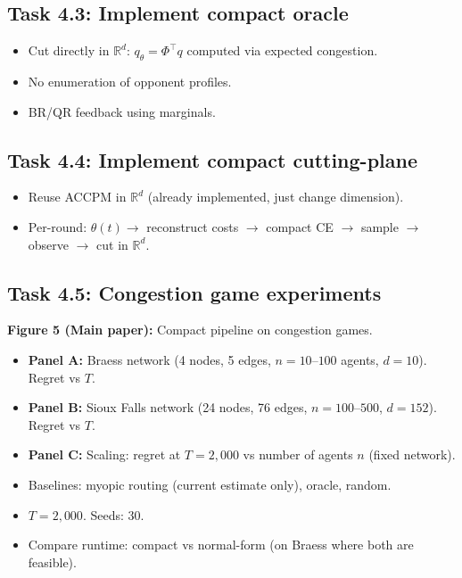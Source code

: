 \documentclass[11pt]{article}
\newcommand{\R}{\mathbb{R}}
\begin{document}
\subsection{Task 4.3: Implement compact oracle}
\begin{itemize}[nosep]
    \item Cut directly in $\R^d$: $q_\theta = \Phi^\top q$ computed via expected congestion.
    \item No enumeration of opponent profiles.
    \item BR/QR feedback using marginals.
\end{itemize}

\subsection{Task 4.4: Implement compact cutting-plane}
\begin{itemize}[nosep]
    \item Reuse ACCPM in $\R^d$ (already implemented, just change dimension).
    \item Per-round: $\theta(t) \to$ reconstruct costs $\to$ compact CE $\to$ sample $\to$ observe $\to$ cut in $\R^d$.
\end{itemize}

\subsection{Task 4.5: Congestion game experiments}

\textbf{Figure 5 (Main paper):} Compact pipeline on congestion games.

\begin{itemize}[nosep]
    \item \textbf{Panel A:} Braess network (4 nodes, 5 edges, $n = 10$--$100$ agents, $d = 10$). Regret vs $T$.
    \item \textbf{Panel B:} Sioux Falls network (24 nodes, 76 edges, $n = 100$--$500$, $d = 152$). Regret vs $T$.
    \item \textbf{Panel C:} Scaling: regret at $T{=}2{,}000$ vs number of agents $n$ (fixed network).
    \item Baselines: myopic routing (current estimate only), oracle, random.
    \item $T = 2{,}000$. Seeds: 30.
    \item Compare runtime: compact vs normal-form (on Braess where both are feasible).
\end{itemize}
\end{document}
